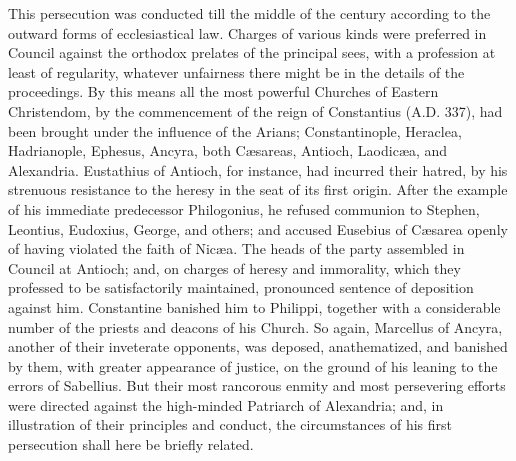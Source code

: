 This persecution was conducted till the middle of the century
according to the outward forms of ecclesiastical law. Charges of
various kinds were preferred in Council against the orthodox prelates
of the principal sees, with a profession at least of regularity,
whatever unfairness there might be in the details of the
proceedings. By this means all the most powerful Churches of Eastern
Christendom, by the commencement of the reign of Constantius (A.D.
337), had been brought under the influence of the Arians;
Constantinople, Heraclea, Hadrianople, Ephesus, Ancyra, both Cæsareas,
Antioch, Laodicæa, and Alexandria. Eustathius of Antioch, for
instance, had incurred their hatred, by his strenuous resistance to
the heresy in the seat of its first origin. After the example of his
immediate predecessor Philogonius, he refused communion to Stephen,
Leontius, Eudoxius, George, and others; and accused Eusebius of
Cæsarea openly of having violated the faith of Nicæa. The heads of
the party assembled in Council at Antioch; and, on charges of heresy
and immorality, which they professed to be satisfactorily maintained,
pronounced sentence of deposition against him. Constantine banished
him to Philippi, together with a considerable number of the priests
and deacons of his Church. So again, Marcellus of Ancyra, another of
their inveterate opponents, was deposed, anathematized, and banished
by them, with greater appearance of justice, on the ground of his
leaning to the errors of Sabellius. But their most rancorous enmity
and most persevering efforts were directed against the high-minded
Patriarch of Alexandria; and, in illustration of their principles and
conduct, the circumstances of his first persecution shall here be
briefly related.

